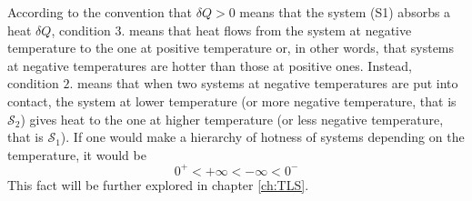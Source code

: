 According to the convention that $\delta Q > 0$ means that the system (S1) absorbs a heat $\delta Q$, condition $3.$ means that heat flows from the system at negative temperature to the one at positive temperature or, in other words, that
systems at negative temperatures are hotter than those at positive ones. Instead, condition $2.$ means that when two systems at negative temperatures are put into contact, the system at lower temperature (or more negative temperature, that is $\mathcal{S}_2$) gives heat to the one at higher temperature (or less negative temperature, that is $\mathcal{S}_1$). If one would make
a hierarchy of hotness of systems depending on the temperature, it would be
\begin{equation*}
    0^+ < +\infty < -\infty < 0^-
\end{equation*}
This fact will be further explored in chapter \ref{ch:TLS}.